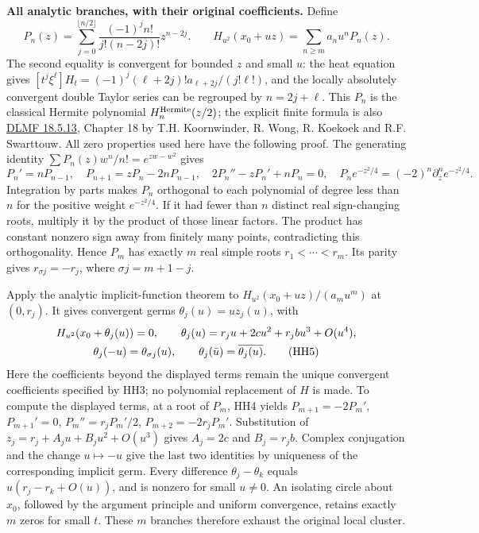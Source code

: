 \HH\textbf{All analytic branches, with their original coefficients.}
Define
\[
 P_n(z)=\sum_{j=0}^{\lfloor n/2\rfloor}
       \frac{(-1)^jn!}{j!(n-2j)!}z^{n-2j}.
 \qquad
 H_{u^2}(x_0+uz)=\sum_{n\ge m}a_nu^nP_n(z).
 \tag{HH3}\label{hh:branches-source}
\]
The second equality is convergent for bounded $z$ and small $u$:
the heat equation gives
$[t^j\xi^\ell]H_t=(-1)^j(\ell+2j)!a_{\ell+2j}/(j!\ell!)$,
and the locally absolutely convergent double Taylor series can be
regrouped by $n=2j+\ell$.
This $P_n$ is the classical Hermite polynomial $H_n^{\rm Hermite}(z/2)$;
the explicit finite formula is also
\href{https://dlmf.nist.gov/18.5.E13}{DLMF 18.5.13},
Chapter 18 by T.H. Koornwinder, R. Wong, R. Koekoek and
R.F. Swarttouw. All zero properties used here have the following proof.
The generating identity $\sum P_n(z)w^n/n!=e^{zw-w^2}$ gives
\[
 P_n'=nP_{n-1},\quad P_{n+1}=zP_n-2nP_{n-1},\quad
 2P_n''-zP_n'+nP_n=0,\quad
 P_ne^{-z^2/4}=(-2)^n\partial_z^n e^{-z^2/4}.
 \tag{HH4}
\]
Integration by parts makes $P_n$ orthogonal to each polynomial of
degree less than $n$ for the positive weight $e^{-z^2/4}$.
If it had fewer than $n$ distinct real sign-changing roots, multiply
it by the product of those linear factors. The product has constant
nonzero sign away from finitely many points, contradicting this
orthogonality. Hence $P_m$ has exactly $m$ real simple roots
$r_1<\cdots<r_m$. Its parity gives $r_{\sigma j}=-r_j$, where
$\sigma j=m+1-j$.

Apply the analytic implicit-function theorem to
$H_{u^2}(x_0+uz)/(a_mu^m)$ at $(0,r_j)$.
It gives convergent germs $\theta_j(u)=uz_j(u)$, with
\begin{gather}
 H_{u^2}(x_0+\theta_j(u))=0,\qquad
 \theta_j(u)=r_ju+2cu^2+r_jbu^3+O(u^4),\notag\\
 \theta_j(-u)=\theta_{\sigma j}(u),\qquad
 \theta_j(\bar u)=\overline{\theta_j(u)} .
 \tag{HH5}\label{hh:theta}
\end{gather}
Here the coefficients beyond the displayed terms remain the unique
convergent coefficients specified by HH3; no polynomial replacement
of $H$ is made. To compute the displayed terms, at a root of $P_m$,
HH4 yields $P_{m+1}=-2P_m'$, $P_{m+1}'=0$,
$P_m''=r_jP_m'/2$, $P_{m+2}=-2r_jP_m'$.
Substitution of $z_j=r_j+A_ju+B_ju^2+O(u^3)$ gives
$A_j=2c$ and $B_j=r_jb$.
Complex conjugation and the change $u\mapsto-u$ give the last two
identities by uniqueness of the corresponding implicit germ.
Every difference $\theta_j-\theta_k$ equals
$u(r_j-r_k+O(u))$, and is nonzero for small $u\ne0$.
An isolating circle about $x_0$, followed by the argument principle
and uniform convergence, retains exactly $m$ zeros for small $t$.
These $m$ branches therefore exhaust the original local cluster.

